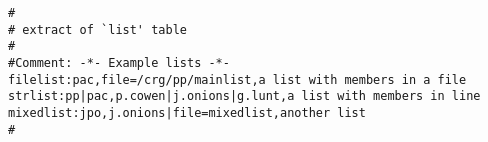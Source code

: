 \small\begin{verbatim}
#
# extract of `list' table
#
#Comment: -*- Example lists -*- 
filelist:pac,file=/crg/pp/mainlist,a list with members in a file
strlist:pp|pac,p.cowen|j.onions|g.lunt,a list with members in line
mixedlist:jpo,j.onions|file=mixedlist,another list
#
\end{verbatim}

